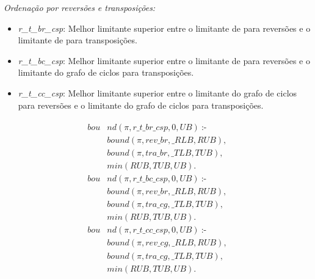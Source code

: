 \textit{Ordenação por reversões e transposições:} 
\begin{itemize}
\item{\textit{r\_t\_br\_csp}: 
Melhor limitante superior entre o limitante de \bkp{} para reversões e
o limitante de \bkp{} para transposições.}
\item{\textit{r\_t\_bc\_csp}:
Melhor limitante superior entre o limitante de \bkp{} para reversões e
o limitante do grafo de ciclos para transposições.}
\item{\textit{r\_t\_cc\_csp}: 
Melhor limitante superior entre o limitante do grafo de ciclos para
reversões e o limitante do grafo de ciclos para transposições.}
\end{itemize}
\begin{align}
  \label{bound_r_t}
  \begin{split}
  \textit{bou}&\textit{nd}(\pi, r\_t\_br\_csp, 0, UB)~\text{:-} \\
  &\textit{bound}(\pi, rev\_br, \_RLB, RUB), \\
  &\textit{bound}(\pi, tra\_br, \_TLB, TUB), \\
  &\textit{min}(RUB, TUB, UB). \\
  \textit{bou}&\textit{nd}(\pi, r\_t\_bc\_csp, 0, UB)~\text{:-} \\
  &\textit{bound}(\pi, rev\_br, \_RLB, RUB), \\
  &\textit{bound}(\pi, tra\_cg, \_TLB, TUB), \\
  &\textit{min}(RUB, TUB, UB). \\
  \textit{bou}&\textit{nd}(\pi, r\_t\_cc\_csp, 0, UB)~\text{:-} \\
  &\textit{bound}(\pi, rev\_cg, \_RLB, RUB), \\
  &\textit{bound}(\pi, tra\_cg, \_TLB, TUB), \\
  &\textit{min}(RUB, TUB, UB).
  \end{split}
\end{align}

